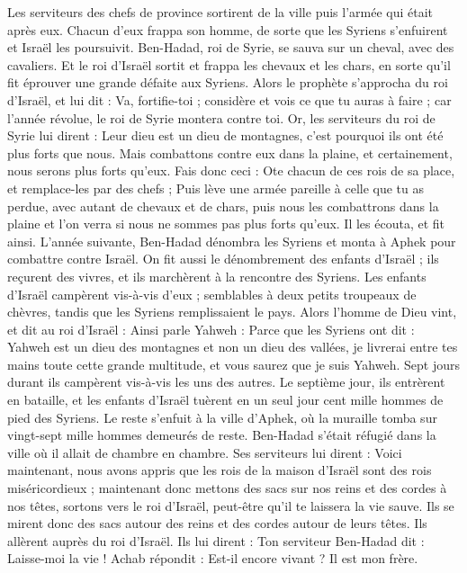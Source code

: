 \begin{multicols}{2}
Les serviteurs des chefs de province sortirent de la ville puis l'armée qui était après eux.
Chacun d'eux frappa son homme, de sorte que les Syriens s'enfuirent et Israël les poursuivit. Ben-Hadad, roi de Syrie, se sauva sur un cheval, avec des cavaliers.
Et le roi d'Israël sortit et frappa les chevaux et les chars, en sorte qu'il fit éprouver une grande défaite aux Syriens.
Alors le prophète s’approcha du roi d'Israël, et lui dit : Va, fortifie-toi ; considère et vois ce que tu auras à faire ; car l’année révolue, le roi de Syrie montera contre toi.
Or, les serviteurs du roi de Syrie lui dirent : Leur dieu est un dieu de montagnes, c'est pourquoi ils ont été plus forts que nous. Mais combattons contre eux dans la plaine, et certainement, nous serons plus forts qu'eux.
Fais donc ceci : Ote chacun de ces rois de sa place, et remplace-les par des chefs ;
Puis lève une armée pareille à celle que tu as perdue, avec autant de chevaux et de chars, puis nous les combattrons dans la plaine et l’on verra si nous ne sommes pas plus forts qu'eux. Il les écouta, et fit ainsi.
L’année suivante, Ben-Hadad dénombra les Syriens et monta à Aphek pour combattre contre Israël.
On fit aussi le dénombrement des enfants d'Israël ; ils reçurent des vivres, et ils marchèrent à la rencontre des Syriens. Les enfants d'Israël campèrent vis-à-vis d'eux ; semblables à deux petits troupeaux de chèvres, tandis que les Syriens remplissaient le pays.
Alors l'homme de Dieu vint, et dit au roi d'Israël : Ainsi parle Yahweh : Parce que les Syriens ont dit : Yahweh est un dieu des montagnes et non un dieu des vallées, je livrerai entre tes mains toute cette grande multitude, et vous saurez que je suis Yahweh.
Sept jours durant ils campèrent vis-à-vis les uns des autres. Le septième jour, ils entrèrent en bataille, et les enfants d'Israël tuèrent en un seul jour cent mille hommes de pied des Syriens.
Le reste s'enfuit à la ville d'Aphek, où la muraille tomba sur vingt-sept mille hommes demeurés de reste. Ben-Hadad s'était réfugié dans la ville où il allait de chambre en chambre.
Ses serviteurs lui dirent : Voici maintenant, nous avons appris que les rois de la maison d'Israël sont des rois miséricordieux ; maintenant donc mettons des sacs sur nos reins et des cordes à nos têtes, sortons vers le roi d'Israël, peut-être qu'il te laissera la vie sauve.
Ils se mirent donc des sacs autour des reins et des cordes autour de leurs têtes. Ils allèrent auprès du roi d'Israël. Ils lui dirent : Ton serviteur Ben-Hadad dit : Laisse-moi la vie ! Achab répondit : Est-il encore vivant ? Il est mon frère.

\end{multicols}
